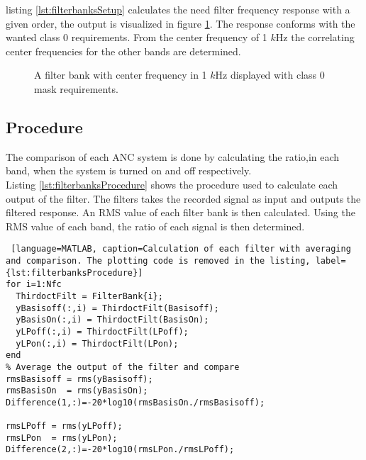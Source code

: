 listing \ref{lst:filterbanksSetup} calculates the need filter frequency response with a given order, the output is visualized in figure \ref{fig:1000KhzFilterClass0}. The response conforms with the wanted class 0 requirements. From the center frequency of 1 $k$Hz the correlating center frequencies for the other bands are determined.

\begin{figure}[H]
	\centering
	
	\caption{A filter bank with center frequency in 1 $k$Hz displayed with class 0 mask requirements.}
	\label{fig:1000KhzFilterClass0}
\end{figure}

\subsection{Procedure}

The comparison of each ANC system is done by calculating the ratio,in each band, when the system is turned on and off respectively. 
\\
Listing \ref{lst:filterbanksProcedure} shows the procedure used to calculate each output of the filter. The filters takes the recorded signal as input and outputs the filtered response. An RMS value of each filter bank is then calculated. Using the RMS value of each band, the ratio of each signal is then determined. 

\begin{lstlisting} [language=MATLAB, caption=Calculation of each filter with averaging and comparison. The plotting code is removed in the listing, label={lst:filterbanksProcedure}]
for i=1:Nfc
  ThirdoctFilt = FilterBank{i};  
  yBasisoff(:,i) = ThirdoctFilt(Basisoff);
  yBasisOn(:,i) = ThirdoctFilt(BasisOn); 
  yLPoff(:,i) = ThirdoctFilt(LPoff);
  yLPon(:,i) = ThirdoctFilt(LPon);    
end
% Average the output of the filter and compare
rmsBasisoff = rms(yBasisoff);
rmsBasisOn  = rms(yBasisOn);
Difference(1,:)=-20*log10(rmsBasisOn./rmsBasisoff);
  
rmsLPoff = rms(yLPoff);
rmsLPon  = rms(yLPon);
Difference(2,:)=-20*log10(rmsLPon./rmsLPoff);
\end{lstlisting}

%
%
%
%

